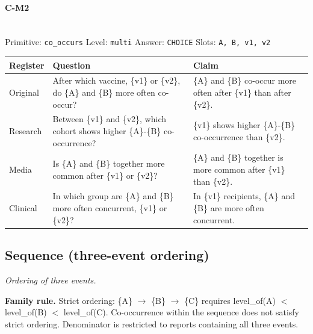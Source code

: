 \documentclass[11pt]{article}
\begin{document}
\paragraph{\textbf{C-M2}}\mbox{}\\
Primitive: \texttt{co\_occurs} \quad Level: \texttt{multi} \quad Answer: \texttt{CHOICE} \quad Slots: \texttt{A, B, v1, v2}\\[2pt]
\begin{tabularx}{\linewidth}{@{}l L L@{}}
\toprule
\textbf{Register} & \textbf{Question} & \textbf{Claim} \\
\midrule
Original & After which vaccine, \{v1\} or \{v2\}, do \{A\} and \{B\} more often co-occur? & \{A\} and \{B\} co-occur more often after \{v1\} than after \{v2\}. \\
Research & Between \{v1\} and \{v2\}, which cohort shows higher \{A\}-\{B\} co-occurrence? & \{v1\} shows higher \{A\}-\{B\} co-occurrence than \{v2\}. \\
Media & Is \{A\} and \{B\} together more common after \{v1\} or \{v2\}? & \{A\} and \{B\} together is more common after \{v1\} than \{v2\}. \\
Clinical & In which group are \{A\} and \{B\} more often concurrent, \{v1\} or \{v2\}? & In \{v1\} recipients, \{A\} and \{B\} are more often concurrent. \\
\bottomrule
\end{tabularx}
\vspace{4pt}

\subsection{Sequence (three-event ordering)}
\noindent\emph{Ordering of three events.}

\noindent\textbf{Family rule.} Strict ordering: \{A\} $\rightarrow$  \{B\} $\rightarrow$  \{C\} requires level\_of(A) $<$ level\_of(B) $<$ level\_of(C). Co-occurrence within the sequence does not satisfy strict ordering. Denominator is restricted to reports containing all three events.
\end{document}
